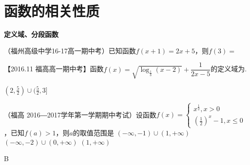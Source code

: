 \section{函数的相关性质}
\begin{exercise}{\bf 定义域、分段函数}
\item
（福州高级中学16-17高一期中考）已知函数$f(x+1)=2x+5$，则$f(3)=$\xz
{}
\item
【2016.11 福高高一期中考】函数$f(x)=\sqrt{\log_{\frac13}(x-2)}+\dfrac1{2x-5}$的定义域为\tk.
\begin{answer}
  $(2,\frac52)\cup(\frac52,3] $
\end{answer}
\item
（福高 2016―2017学年第一学期期中考试）设函数$\displaystyle f(x)=\begin{cases}x^{\frac12},x>0\\(\frac12)^x-1,x\leq0\end{cases} $，已知$f(a)>1$，则$a$的取值范围是\xz
{}
{$(-\infty,-1)\cup(1,+\infty)$}
{$(-\infty,-2)\cup(0,+\infty)$}
{$(1,+\infty)$}
\begin{answer}
  B
\end{answer}
\end{exercise}
